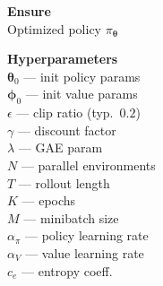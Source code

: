 \documentclass[11pt]{article}
\begin{document}
\begin{algorithm}[p]\small
\caption{PPO-Clip --- Practical Vectorized Implementation}\label{alg:ppo-practical}
\vspace{2pt}
\noindent
\begin{minipage}[t]{0.28\linewidth}
\renewcommand{\arraystretch}{1.12}
\textbf{Ensure} \\[2pt]
Optimized policy $\pi_{\boldsymbol{\theta}}$

\vspace{6pt}
\textbf{Hyperparameters} \\[2pt]
$\boldsymbol{\theta}_0$ --- init policy params \\
$\boldsymbol{\phi}_0$ --- init value params \\
$\epsilon$ --- clip ratio (typ.\ $0.2$) \\
$\gamma$ --- discount factor \\
$\lambda$ --- GAE param \\
$N$ --- parallel environments \\
$T$ --- rollout length \\
$K$ --- epochs \\
$M$ --- minibatch size \\
$\alpha_\pi$ --- policy learning rate \\
$\alpha_V$ --- value learning rate \\
$c_e$ --- entropy coeff.


\end{minipage}
\end{algorithm}
\end{document}
